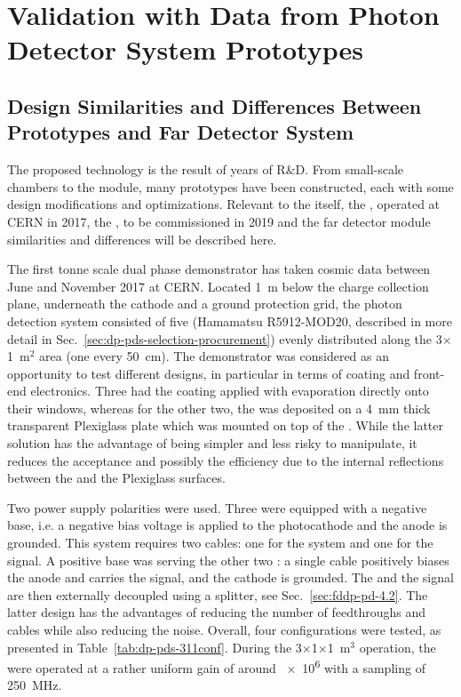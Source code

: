 \section{Validation with Data from Photon Detector System Prototypes}
\label{sec:dp-pds-prototypes}

\subsection{Design Similarities and Differences Between Prototypes and Far Detector System}
The    proposed technology is the result of years of R\&D. From small-scale chambers to the  module, many prototypes have been constructed, each with some design modifications and optimizations. 
Relevant to the  itself, the , operated at CERN in 2017, the , to be commissioned in 2019 and the  far detector module similarities and differences will be described here.

The first tonne scale dual phase   demonstrator has taken cosmic data between June and November \num{2017} at CERN. 
Located \SI{1}{m} below the charge collection plane, underneath the cathode and a ground protection grid, the photon detection system consisted of five  (Hamamatsu R5912-MOD20, described in more detail in Sec.~\ref{sec:dp-pds-selection-procurement}) evenly distributed along the 3$\times$1~m$^2$ area (one  every \SI{50}{cm}). The demonstrator was considered as an opportunity to test different  designs, in particular in terms of  coating and front-end electronics. Three  had the  coating applied with evaporation directly onto their windows, whereas for the other two, the  was deposited on a \SI{4}{\mm} thick transparent Plexiglass plate which was mounted on top of the . 
While the latter solution has the advantage of being simpler and less risky to manipulate, it reduces the acceptance and possibly the efficiency due to the internal reflections between the  and the Plexiglass surfaces. 

Two power supply polarities were used. Three  were equipped with a negative  base, i.e. a negative bias voltage is applied to the photocathode and the anode is grounded. This system requires two cables: one for the  system and one for the signal. A positive base was serving the other two : a single cable positively biases the anode and carries the signal, and the cathode is grounded. The  and the signal are then externally decoupled using a splitter, see Sec.~\ref{sec:fddp-pd-4.2}. The latter design has the advantages of reducing the number of feedthroughs and cables while also reducing the noise. Overall, four configurations were tested, as presented in Table~\ref{tab:dp-pds-311conf}. During the 3$\times$1$\times$1~m$^3$ operation, the  were operated at a rather uniform gain of around \num{e6} with a sampling of \SI{250}{MHz}.

